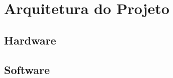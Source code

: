 \documentclass[../delivery_hospital_report.tex]{subfiles}
\begin{document}
\chapter{Arquitetura do Projeto}


\section{Hardware}
\section{Software}
\end{document}
